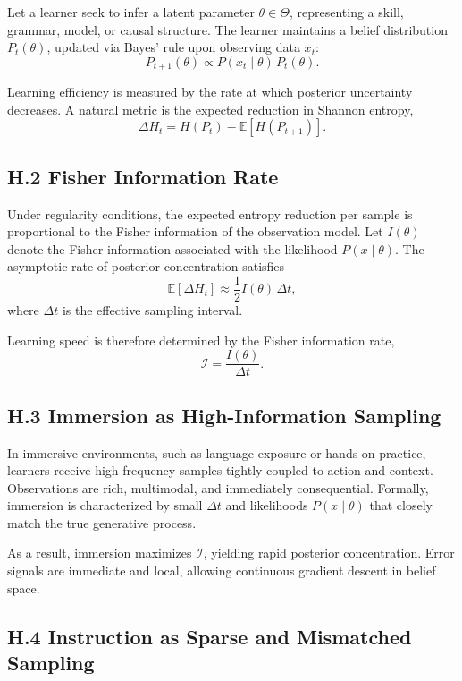 \documentclass[11pt]{article}
\begin{document}
Let a learner seek to infer a latent parameter \(\theta \in \Theta\), representing a skill, grammar, model, or causal structure. The learner maintains a belief distribution \(P_t(\theta)\), updated via Bayes’ rule upon observing data \(x_t\):
\[
P_{t+1}(\theta) \propto P(x_t \mid \theta)\,P_t(\theta).
\]

Learning efficiency is measured by the rate at which posterior uncertainty decreases. A natural metric is the expected reduction in Shannon entropy,
\[
\Delta H_t = H(P_t) - \mathbb{E}[H(P_{t+1})].
\]

\subsection{H.2 Fisher Information Rate}

Under regularity conditions, the expected entropy reduction per sample is proportional to the Fisher information of the observation model. Let \(I(\theta)\) denote the Fisher information associated with the likelihood \(P(x \mid \theta)\). The asymptotic rate of posterior concentration satisfies
\[
\mathbb{E}[\Delta H_t] \approx \frac{1}{2} I(\theta)\,\Delta t,
\]
where \(\Delta t\) is the effective sampling interval.

Learning speed is therefore determined by the Fisher information rate,
\[
\mathcal{I} = \frac{I(\theta)}{\Delta t}.
\]

\subsection{H.3 Immersion as High-Information Sampling}

In immersive environments, such as language exposure or hands-on practice, learners receive high-frequency samples tightly coupled to action and context. Observations are rich, multimodal, and immediately consequential. Formally, immersion is characterized by small \(\Delta t\) and likelihoods \(P(x \mid \theta)\) that closely match the true generative process.

As a result, immersion maximizes \(\mathcal{I}\), yielding rapid posterior concentration. Error signals are immediate and local, allowing continuous gradient descent in belief space.

\subsection{H.4 Instruction as Sparse and Mismatched Sampling}
\end{document}
